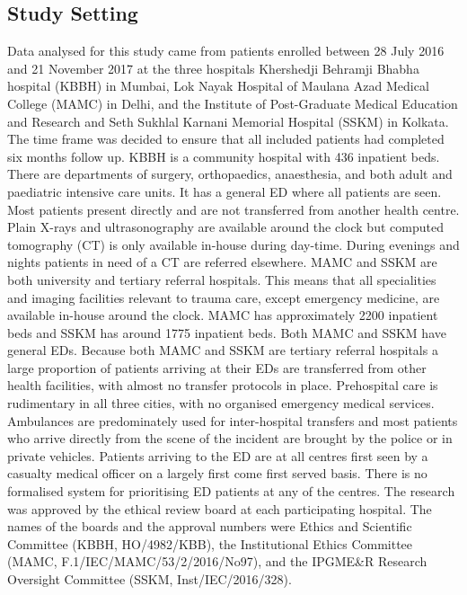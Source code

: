 \documentclass[10pt,letterpaper]{article}\usepackage[]{graphicx}\usepackage[]{color}
\begin{document}
\subsection*{Study Setting}
Data analysed for this study came from patients enrolled between 28 July 2016
and 21 November 2017 at the three hospitals Khershedji Behramji Bhabha hospital
(KBBH) in Mumbai, Lok Nayak Hospital of Maulana Azad Medical College (MAMC) in
Delhi, and the Institute of Post-Graduate Medical Education and Research and
Seth Sukhlal Karnani Memorial Hospital (SSKM) in Kolkata. The time frame was
decided to ensure that all included patients had completed six months follow
up. KBBH is a community hospital with 436 inpatient beds. There are departments
of surgery, orthopaedics, anaesthesia, and both adult and paediatric intensive
care units. It has a general ED where all patients are seen. Most patients
present directly and are not transferred from another health centre. Plain
X-rays and ultrasonography are available around the clock but computed
tomography (CT) is only available in-house during day-time. During evenings and
nights patients in need of a CT are referred elsewhere. MAMC and SSKM are both
university and tertiary referral hospitals. This means that all specialities and
imaging facilities relevant to trauma care, except emergency medicine, are
available in-house around the clock. MAMC has approximately 2200 inpatient beds
and SSKM has around 1775 inpatient beds. Both MAMC and SSKM have general
EDs. Because both MAMC and SSKM are tertiary referral hospitals a large
proportion of patients arriving at their EDs are transferred from other health
facilities, with almost no transfer protocols in place. Prehospital care is
rudimentary in all three cities, with no organised emergency medical
services. Ambulances are predominately used for inter-hospital transfers and
most patients who arrive directly from the scene of the incident are brought by
the police or in private vehicles. Patients arriving to the ED are at all
centres first seen by a casualty medical officer on a largely first come first
served basis. There is no formalised system for prioritising ED patients at any
of the centres. The research was approved by the ethical review board at each
participating hospital. The names of the boards and the approval numbers were
Ethics and Scientific Committee (KBBH, HO/4982/KBB), the Institutional Ethics
Committee (MAMC, F.1/IEC/MAMC/53/2/2016/No97), and the IPGME\&R Research
Oversight Committee (SSKM, Inst/IEC/2016/328).

\end{document}
